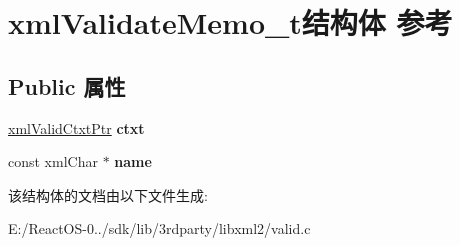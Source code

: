 \hypertarget{structxml_validate_memo__t}{}\section{xml\+Validate\+Memo\+\_\+t结构体 参考}
\label{structxml_validate_memo__t}
\subsection*{Public 属性}
\begin{DoxyCompactItemize}
\item 
\mbox{\label{structxml_validate_memo__t_a3103a81163ee0ad8a6573634d276ab67}} 
\hyperlink{struct__xml_valid_ctxt}{xml\+Valid\+Ctxt\+Ptr} {\bfseries ctxt}
\item 
\mbox{\label{structxml_validate_memo__t_a8659d60c1f7694dba123f08234120a3d}} 
const xml\+Char $\ast$ {\bfseries name}
\end{DoxyCompactItemize}


该结构体的文档由以下文件生成\+:\begin{DoxyCompactItemize}
\item 
E\+:/\+React\+O\+S-\/0../sdk/lib/3rdparty/libxml2/valid.\+c\end{DoxyCompactItemize}
